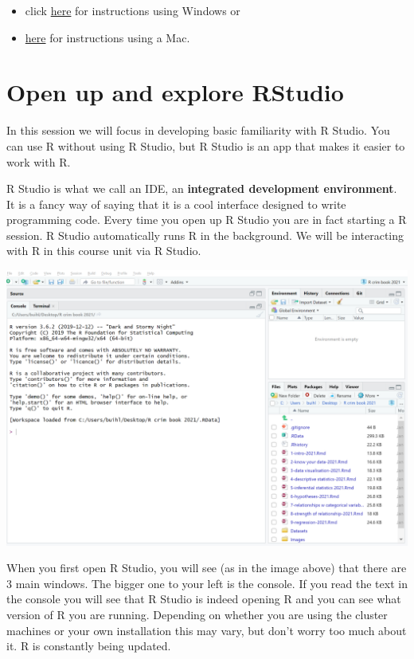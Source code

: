 \documentclass[]{book}
\providecommand{\tightlist}{%
  \setlength{\itemsep}{0pt}\setlength{\parskip}{0pt}}
\begin{document}
\begin{itemize}
\tightlist
\item
  click \href{https://www.youtube.com/watch?v=eD07NznguA4}{here} for instructions using Windows or
\item
  \href{https://www.youtube.com/watch?v=cX532N_XLIs\&list=PLqzoL9-eJTNDw71zWePXyHx3_cm_fMP8S}{here} for instructions using a Mac.
\end{itemize}

\hypertarget{open-up-and-explore-rstudio}{%
\section{Open up and explore RStudio}\label{open-up-and-explore-rstudio}}

In this session we will focus in developing basic familiarity with R Studio. You can use R without using R Studio, but R Studio is an app that makes it easier to work with R.

R Studio is what we call an IDE, an \textbf{integrated development environment}. It is a fancy way of saying that it is a cool interface designed to write programming code. Every time you open up R Studio you are in fact starting a R session. R Studio automatically runs R in the background. We will be interacting with R in this course unit via R Studio.

\includegraphics{img/rstudio.png}

When you first open R Studio, you will see (as in the image above) that there are 3 main windows. The bigger one to your left is the console. If you read the text in the console you will see that R Studio is indeed opening R and you can see what version of R you are running. Depending on whether you are using the cluster machines or your own installation this may vary, but don't worry too much about it. R is constantly being updated.
\end{document}
